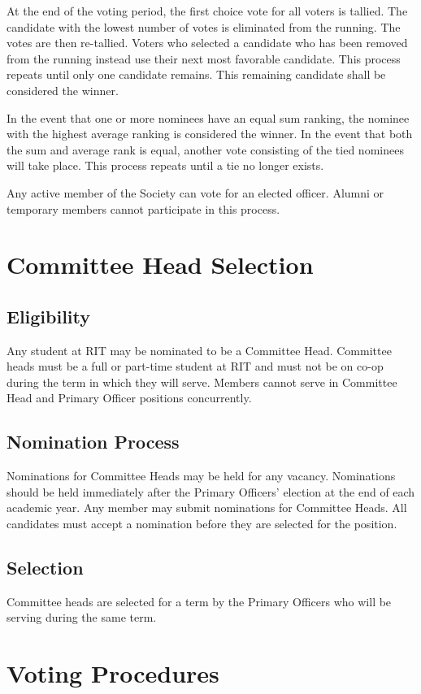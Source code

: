 \documentclass[american]{article}
\begin{document}
At the end of the voting period, the first choice vote for all voters is tallied. The candidate with the lowest number of votes is eliminated from the running. The votes are then re-tallied. Voters who selected a candidate who has been removed from the running instead use their next most favorable candidate. This process repeats until only one candidate remains. This remaining candidate shall be considered the winner.

In the event that one or more nominees have an equal sum ranking, the nominee with the highest average ranking is considered the winner. In the event that both the sum and average rank is equal, another vote consisting of the tied nominees will take place. This process repeats until a tie no longer exists.

Any active member of the Society can vote for an elected officer. Alumni or temporary members cannot participate in this process.

\section{Committee Head Selection}

\subsection{Eligibility}
Any student at RIT may be nominated to be a Committee Head. Committee heads must be a full or part-time student at RIT and must not be on co-op during the term in which they will serve. Members cannot serve in Committee Head and Primary Officer positions concurrently.

\subsection{Nomination Process}
Nominations for Committee Heads may be held for any vacancy. Nominations should be held immediately after the Primary Officers' election at the end of each academic year. Any member may submit nominations for Committee Heads. All candidates must accept a nomination before they are selected for the position.

\subsection{Selection}
Committee heads are selected for a term by the Primary Officers who will be serving during the same term.

\section{Voting Procedures}
\end{document}
